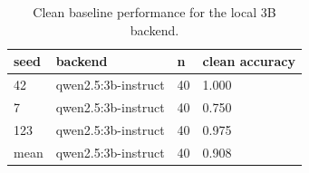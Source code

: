 \begin{table}[t]
\centering
\caption{Clean baseline performance for the local 3B backend.}
\label{tab:baseline}
\begin{tabular}{llll}
\toprule
seed & backend & n & clean accuracy \\
\midrule
42 & qwen2.5:3b-instruct & 40 & 1.000 \\
7 & qwen2.5:3b-instruct & 40 & 0.750 \\
123 & qwen2.5:3b-instruct & 40 & 0.975 \\
mean & qwen2.5:3b-instruct & 40 & 0.908 \\
\bottomrule
\end{tabular}
\end{table}
